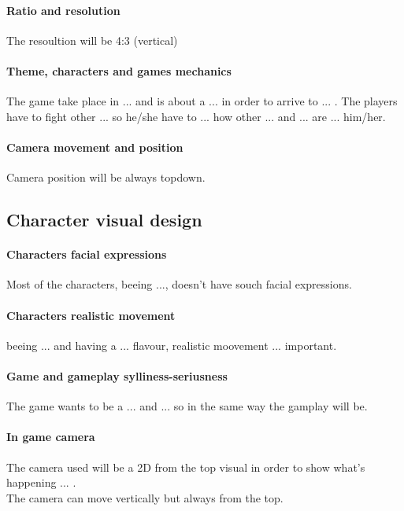 \paragraph{Ratio and resolution}
The resoultion will be 4:3 (vertical)
\paragraph{Theme, characters and games mechanics}
The game take place in ...  and is about a ...
in order to arrive to ... . The players have to fight other ...
so he/she have to ... how other ... and ...
are ... him/her.
\paragraph{Camera movement and position}
Camera position will be always topdown.


\subsection{Character visual design}
\paragraph{Characters facial expressions} Most of the characters,
beeing ..., doesn't have souch facial expressions.
\paragraph{Characters realistic movement} beeing ... and having a
... flavour, realistic moovement ... important.
\paragraph{Game and gameplay sylliness-seriusness}
The game wants to be a ... and ...
so in the same way the gamplay will be.
\paragraph{In game camera}
The camera used will be a 2D from the top visual in order to show
what's happening ... .\\
The camera can move vertically but always from the top.
